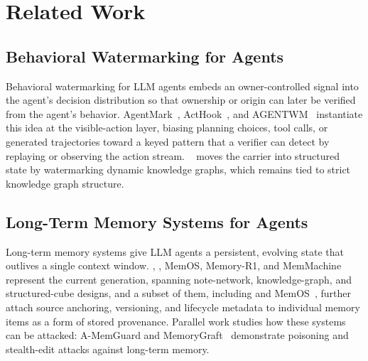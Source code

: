 \section{Related Work}
\label{sec:related}

\subsection{Behavioral Watermarking for Agents}
\label{sec:related-behavioral}
Behavioral watermarking for LLM agents embeds an owner-controlled signal into the agent's decision distribution so that ownership or origin can later be verified from the agent's behavior. AgentMark~\cite{agentmark}, ActHook~\cite{acthook}, and AGENTWM~\cite{agentwm} instantiate this idea at the visible-action layer, biasing planning choices, tool calls, or generated trajectories toward a keyed pattern that a verifier can detect by replaying or observing the action stream. \kgmark{}~\cite{kgmark} moves the carrier into structured state by watermarking dynamic knowledge graphs, which remains tied to strict knowledge graph structure. 

\subsection{Long-Term Memory Systems for Agents}
\label{sec:related-memory}
Long-term memory systems give LLM agents a persistent, evolving state that outlives a single context window. \amem{}, \graphiti{}, MemOS, Memory-R1, and MemMachine~\cite{amem,graphiti,memos,memmachine,yan2025memory} represent the current generation, spanning note-network, knowledge-graph, and structured-cube designs, and a subset of them, including \tiermem{} and MemOS~\cite{tiermem,memos}, further attach source anchoring, versioning, and lifecycle metadata to individual memory items as a form of stored provenance. Parallel work studies how these systems can be attacked: A-MemGuard and MemoryGraft~\cite{amemguard,memorygraft} demonstrate poisoning and stealth-edit attacks against long-term memory. 